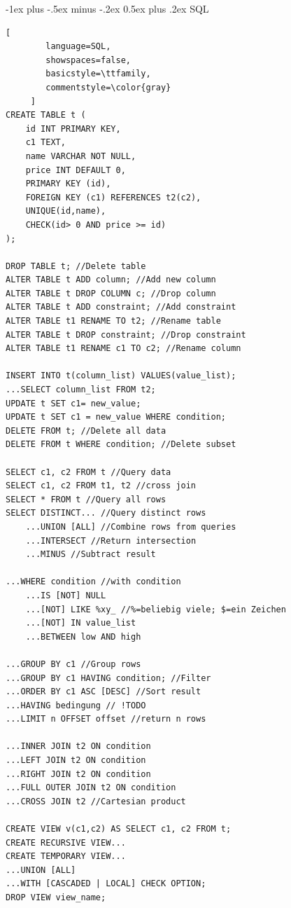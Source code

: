 \documentclass[a4paper]{article}
\makeatletter
\renewcommand{\section}{\@startsection{section}{1}{0mm}%
                                {-1ex plus -.5ex minus -.2ex}%
                                {0.5ex plus .2ex}%
                                {\normalfont\large\bfseries}}
\makeatother
\begin{document}
\raggedright
\begin{multicols}{3}
    \scriptsize
    \setlength{\premulticols}{1pt}
    \setlength{\postmulticols}{1pt}
    \setlength{\multicolsep}{1pt}
    \setlength{\columnsep}{2pt}

    \section{SQL}
    \begin{lstlisting}[
        language=SQL,
        showspaces=false,
        basicstyle=\ttfamily,
        commentstyle=\color{gray}
     ]
CREATE TABLE t (
    id INT PRIMARY KEY,
    c1 TEXT,
    name VARCHAR NOT NULL,
    price INT DEFAULT 0,
    PRIMARY KEY (id),
    FOREIGN KEY (c1) REFERENCES t2(c2),
    UNIQUE(id,name), 
    CHECK(id> 0 AND price >= id)
);

DROP TABLE t; //Delete table
ALTER TABLE t ADD column; //Add new column
ALTER TABLE t DROP COLUMN c; //Drop column
ALTER TABLE t ADD constraint; //Add constraint
ALTER TABLE t1 RENAME TO t2; //Rename table
ALTER TABLE t DROP constraint; //Drop constraint
ALTER TABLE t1 RENAME c1 TO c2; //Rename column

INSERT INTO t(column_list) VALUES(value_list);
...SELECT column_list FROM t2;
UPDATE t SET c1= new_value;
UPDATE t SET c1 = new_value WHERE condition;
DELETE FROM t; //Delete all data
DELETE FROM t WHERE condition; //Delete subset

SELECT c1, c2 FROM t //Query data
SELECT c1, c2 FROM t1, t2 //cross join
SELECT * FROM t //Query all rows
SELECT DISTINCT... //Query distinct rows
    ...UNION [ALL] //Combine rows from queries
    ...INTERSECT //Return intersection
    ...MINUS //Subtract result

...WHERE condition //with condition
    ...IS [NOT] NULL
    ...[NOT] LIKE %xy_ //%=beliebig viele; $=ein Zeichen
    ...[NOT] IN value_list
    ...BETWEEN low AND high

...GROUP BY c1 //Group rows
...GROUP BY c1 HAVING condition; //Filter
...ORDER BY c1 ASC [DESC] //Sort result
...HAVING bedingung // !TODO
...LIMIT n OFFSET offset //return n rows

...INNER JOIN t2 ON condition
...LEFT JOIN t2 ON condition
...RIGHT JOIN t2 ON condition
...FULL OUTER JOIN t2 ON condition
...CROSS JOIN t2 //Cartesian product

CREATE VIEW v(c1,c2) AS SELECT c1, c2 FROM t;
CREATE RECURSIVE VIEW...
CREATE TEMPORARY VIEW... 
...UNION [ALL]
...WITH [CASCADED | LOCAL] CHECK OPTION;
DROP VIEW view_name;


\end{lstlisting}
\end{multicols}
\end{document}
